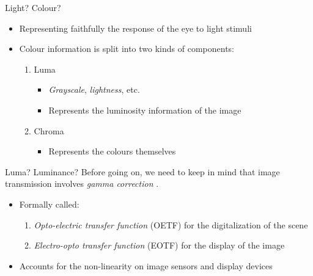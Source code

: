 \documentclass[aspectratio=169,handout,usepdftitle=false]{fireshonks}
\begin{document}
\begin{frame}{Light? Colour?}
    \begin{itemize}
        \item Representing faithfully the response of the eye to light stimuli
        \item Colour information is split into two kinds of components:
              \begin{enumerate}
                  \item Luma
                        \begin{itemize}
                            \item \emph{Grayscale}, \emph{lightness}, etc.
                            \item Represents the luminosity information of the image
                        \end{itemize}
                  \item Chroma
                        \begin{itemize}
                            \item Represents the colours themselves
                        \end{itemize}
              \end{enumerate}
    \end{itemize}
\end{frame}
\begin{frame}{Luma? Luminance?}
    Before going on, we need to keep in mind that image transmission involves \emph{gamma correction} \autocite{tooms}.
    \begin{itemize}
        \item Formally called:
              \begin{enumerate}
                  \item \emph{Opto-electric transfer function} (OETF) for the digitalization of the scene
                  \item \emph{Electro-opto transfer function} (EOTF) for the display of the image
              \end{enumerate}
        \item Accounts for the non-linearity on image sensors and display devices
    \end{itemize}
\end{frame}
\end{document}
